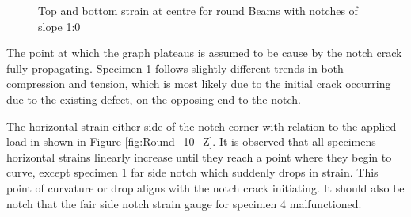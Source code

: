 \documentclass[11pt,a4paper]{article}
\numberwithin{equation}{subsection}
\begin{document}
\begin{figure}[h]
	\begin{center}
	\end{center}
	\caption{Top and bottom strain at centre for round Beams with notches of slope 1:0}
	\label{fig:Round_10_Centre}
\end{figure}
\pagebreak
\noindent
The point at which the graph plateaus is assumed to be cause by the notch crack fully propagating. Specimen 1 follows slightly different trends in both compression and tension, which is most likely due to the initial crack occurring due to the existing defect, on the opposing end to the notch.

\vspace*{\baselineskip}

\noindent
The horizontal strain either side of the notch corner with relation to the applied load in shown in Figure \ref{fig:Round_10_Z}. It is observed that all specimens horizontal strains linearly increase until they reach a point where they begin to curve, except specimen 1 far side notch which suddenly drops in strain. This point of curvature or drop aligns with the notch crack initiating. It should also be notch that the fair side notch strain gauge for specimen 4 malfunctioned.
\end{document}
